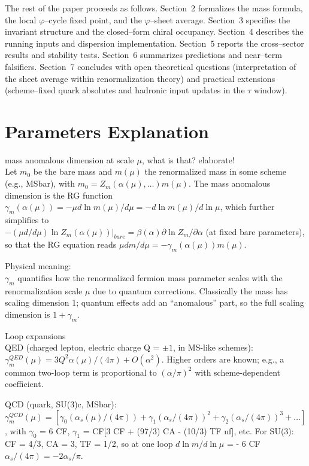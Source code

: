 \documentclass[%
 amsmath,amssymb,
 aps,
prb,
floatfix, showkeys
]{revtex4-2}
\begin{document}
The rest of the paper proceeds as follows. Section~2 formalizes the mass formula, the local $\varphi$--cycle fixed point, and the $\varphi$--sheet average. Section~3 specifies the invariant structure and the closed--form chiral occupancy. Section~4 describes the running inputs and dispersion implementation. Section~5 reports the cross--sector results and stability tests. Section~6 summarizes predictions and near--term falsifiers. Section~7 concludes with open theoretical questions (interpretation of the sheet average within renormalization theory) and practical extensions (scheme--fixed quark absolutes and hadronic input updates in the $\tau$ window).


 



\section{Parameters Explanation}
 mass anomalous dimension at scale $\mu$, what is that? elaborate! \\
 Let $m_0$ be the bare mass and $m(\mu)$ the renormalized mass in some scheme
 (e.g., MSbar), with $m_0 = Z_m(\alpha(\mu),…) m(\mu)$.
 The mass anomalous dimension is the RG function
 $\gamma_m(\alpha(\mu)) = - \mu d \ln m(\mu)/d\mu = - d \ln m(\mu)/d \ln \mu$,
 which further simplifies to \\
$-(\mu d/d \mu) \ln Z_m(\alpha(\mu)) \vert_{bare} =
 \beta(\alpha) \partial  \ln Z_m/\partial \alpha$ (at fixed bare parameters),
 so that the RG equation reads
 $\mu dm/d \mu = - \gamma_m( \alpha( \mu)) m(\mu)$.

    Physical meaning:\\
    $\gamma_m$ quantifies how the renormalized fermion mass parameter scales with the
renormalization scale $\mu$ due to quantum corrections.
Classically the mass has scaling dimension 1; quantum effects add an “anomalous” part,
so the full scaling dimension is $1 + \gamma_m$.

    Loop expansions \\

QED (charged lepton, electric charge Q = $\pm 1$, in MS-like schemes):
 $\gamma_m^{QED}(\mu) = 3 Q^2 \alpha(\mu)/(4 \pi) + O(\alpha^2)$.
 Higher orders are known; e.g., a common two-loop term is proportional to
 $(\alpha/ \pi)^2$ with scheme-dependent coefficient.
    
 QCD (quark, SU(3)c, MSbar):
 $\gamma_m^{QCD}(\mu) = [\gamma_0 (\alpha_s(\mu)/(4\pi)) + \gamma_1 (\alpha_s/(4\pi))^2 + \gamma_2 (\alpha_s/(4\pi))^3 + …]$, with $\gamma_0$ = 6 CF, $\gamma_1$ = CF[3 CF + (97/3) CA - (10/3) TF nf], etc.
 For SU(3): CF = 4/3, CA = 3, TF = 1/2, so at one loop
 $d \ln m/ d \ln \mu$ = - 6 CF $\alpha_s/(4\pi) = - 2 \alpha_s/\pi$.
\end{document}
